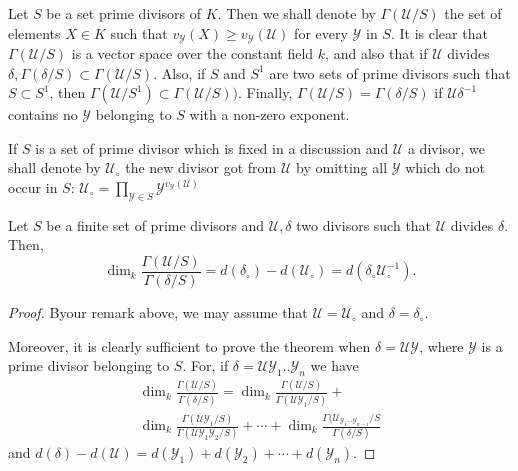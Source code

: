 Let $S$ be a set prime divisors of $K$. Then we shall denote by
$\Gamma (\mathscr{U}/S)$ the set of elements $X \in K$ such that
$v_\mathscr{Y} (X) \geq v_\mathscr{Y}(\mathscr{U})$ for every
$\mathscr{Y}$ in $S$. It is clear that $\Gamma (\mathscr{U}/S)$ is a
vector space over the constant field $k$, and also that if
$\mathscr{U}$ divides $\delta, \Gamma (\delta /S) \subset
\Gamma(\mathscr{U}/S)$. Also, if $S$ and $S^1$ are two sets of prime
divisors such that $S \subset S^1$, then $\Gamma (\mathscr{U}/S^1)
\subset \Gamma (\mathscr{U}/S))$. Finally, $\Gamma (\mathscr{U}/S) =
\Gamma(\delta /S)$ if $\mathscr{U}\delta^{-1}$ contains no
$\mathscr{Y}$ belonging to $S$ with a non-zero exponent. 

If $S$ is a set of prime divisor which is fixed in a discussion and
$\mathscr{U}$ a divisor, we shall denote by $\mathscr{U}_\circ$ the
new divisor got from $\mathscr{U}$ by omitting all $\mathscr{Y}$ which
do not occur in $S$: $\mathscr{U}_\circ = \prod \limits_{\mathscr{Y}
  \in S} \mathscr{Y}^{v_\mathscr{Y}(\mathscr{U})}$ 

\begin{theorem*}
  Let $S$ be a finite set of prime divisors and  $\mathscr{U}, \delta$
  two divisors such that $\mathscr{U}$ divides $\delta$. Then, 
  $$
  \dim_k \frac{\Gamma (\mathscr{U}/S)}{\Gamma(\delta/S)}=d(\delta_\circ)
  - d(\mathscr{U}_\circ) = d(\delta_\circ \mathscr{U}_\circ ^{-1}). 
  $$
\end{theorem*}

\begin{proof}
  By\pageoriginale our remark above, we may assume that $\mathscr{U}=
  \mathscr{U}_\circ$ and $\delta = \delta_\circ$. 

  Moreover, it is clearly sufficient to prove the theorem when $\delta =
  \mathscr{U} \mathscr{Y}$, where $\mathscr{Y}$ is a prime divisor
  belonging to $S$. For, if $\delta = \mathscr{U} \mathscr{Y}_1
  ..\mathscr{Y}_n$ we have 
  \begin{multline*}
    \dim_k \frac{\Gamma (\mathscr{U}/S)}{ \Gamma(\delta/S)} = \dim _k
    \frac{\Gamma (\mathscr{U}/S)} {\Gamma(\mathscr{U} \mathscr{Y}_1/S)}+\\
    \dim_k \frac{\Gamma (\mathscr{U}
      \mathscr{Y}_1/S)}{\Gamma(\mathscr{U}\mathscr{Y}_1 \mathscr{Y}_2 /S)}
    + \cdots + \dim_k \frac{\Gamma (\mathscr{U}_{\mathscr{Y}_1\cdots
        \mathscr{Y}_{n-1}}/S}{ \Gamma(\delta/S)}   
  \end{multline*}
  and $d(\delta) - d(\mathscr{U}) = d(\mathscr{Y}_1) + d(\mathscr{Y}_2)
  + \cdots + d(\mathscr{Y}_n)$. 
\end{proof}


